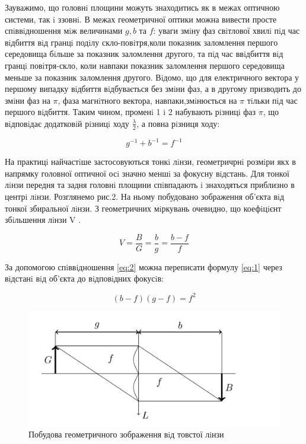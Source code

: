 Зауважимо, що головнi площини можуть знаходитись як в межах оптичною системи, так i ззовнi. В
межах геометричної оптики можна вивести просте спiввiдношення мiж величинами $g, b$ та $f$: уваги змiну
фаз свiтлової хвилi пiд час вiдбиття вiд гранцi подiлу скло-повiтря,коли показник заломлення першого
середовища бiльше за показник заломлення другого, та пiд час ввiдбиття вiд гранцi повiтря-скло, коли
навпаки показник заломлення першого середовища меньше за показник заломлення другого. Вiдомо, що
для електричного вектора у першому випадку вiдбиття вiдбувається без змiни фаз, а в другому призводить
до змiни фаз на $\pi$, фаза магнiтного вектора, навпаки,змiнюється на $\pi$ тiльки пiд час першого вiдбиття.
Таким чином, променi 1 i 2 набувають рiзницi фаз $\pi$, що вiдповiдає додатковiй рiзницi ходу $\frac{\lambda}{2}$, а повна
рiзниця ходу:

\begin{equation} \label{eq:1}
    g^{-1} + b^{-1} = f^{-1}
\end{equation}

На практицi найчастiше застосовуються тонкi лiнзи, геометричрнi розмiри якх в напрямку головної
оптичної осi значно меншi за фокусну вiдстань. Для тонкої лiнзи передня та задня головнi площини
спiвпадають i знаходяться приблизно в центрi лiнзи. Розглянемо рис.2. На ньому побудовано зображення
об’єкта вiд тонкої збиральної лiнзи. З геометричних мiркувань очевидно, що коефiцiєнт збiльшення
лiнзи V .

\begin{equation} \label{eq:2}
    V = \frac{B}{G} = \frac{b}{g} = \frac{b-f}{f} 
\end{equation}

За допомогою спiввiдношення \ref{eq:2} можна переписати формулу \ref{eq:1}
через вiдстанi вiд об’єкта до вiдповiдних фокусiв:

\begin{equation} \label{eq:3}
    (b-f)(g-f) = f^2
\end{equation}

\begin{figure}[h]
    \centering
    \includegraphics[width=.6\textwidth]{assets/2.png}
    \caption{Побудова геометричного зображення вiд товстої лiнзи}
\end{figure}